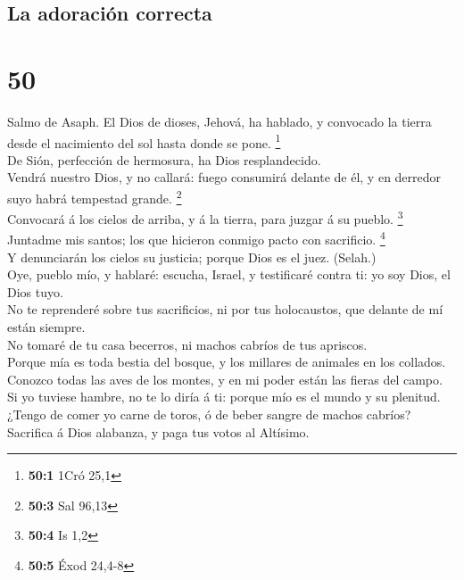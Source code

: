 \hypertarget{la-adoraciuxf3n-correcta}{%
\subsection{La adoración correcta}\label{la-adoraciuxf3n-correcta}}

\hypertarget{section-49}{%
\section{50}\label{section-49}}

 Salmo de Asaph. El Dios de dioses, Jehová, ha hablado, y
convocado la tierra desde el nacimiento del sol hasta donde se pone.
\footnote{\textbf{50:1} 1Cró 25,1}\\
 De Sión, perfección de hermosura, ha Dios resplandecido.\\
 Vendrá nuestro Dios, y no callará: fuego consumirá delante
de él, y en derredor suyo habrá tempestad grande. \footnote{\textbf{50:3}
  Sal 96,13}\\
 Convocará á los cielos de arriba, y á la tierra, para
juzgar á su pueblo. \footnote{\textbf{50:4} Is 1,2}\\
 Juntadme mis santos; los que hicieron conmigo pacto con
sacrificio. \footnote{\textbf{50:5} Éxod 24,4-8}\\
 Y denunciarán los cielos su justicia; porque Dios es el
juez. (Selah.)\\
 Oye, pueblo mío, y hablaré: escucha, Israel, y testificaré
contra ti: yo soy Dios, el Dios tuyo.\\
 No te reprenderé sobre tus sacrificios, ni por tus
holocaustos, que delante de mí están siempre.\\
 No tomaré de tu casa becerros, ni machos cabríos de tus
apriscos.\\
 Porque mía es toda bestia del bosque, y los millares de
animales en los collados.\\
 Conozco todas las aves de los montes, y en mi poder están
las fieras del campo.\\
 Si yo tuviese hambre, no te lo diría á ti: porque mío es
el mundo y su plenitud.\\
 ¿Tengo de comer yo carne de toros, ó de beber sangre de
machos cabríos?\\
 Sacrifica á Dios alabanza, y paga tus votos al Altísimo.\\
